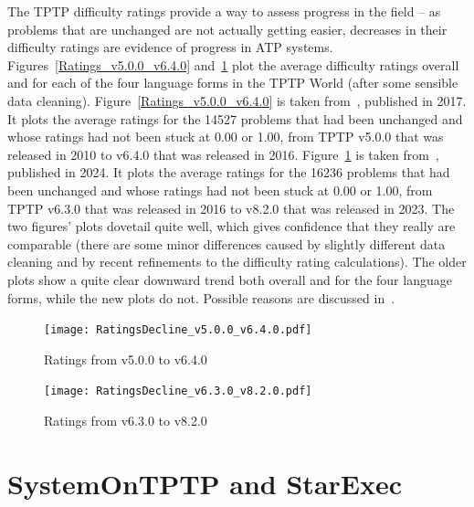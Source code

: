 \documentclass{easychair}
\begin{document}
The TPTP difficulty ratings provide a way to assess progress in the field -- as problems that 
are unchanged are not actually getting easier, decreases in their difficulty ratings are evidence 
of progress in ATP systems.
Figures~\ref{Ratings_v5.0.0_v6.4.0} and~\ref{Ratings_v6.3.0_v8.2.0} plot the average difficulty
ratings overall and for each of the four language forms in the TPTP World (after some sensible
data cleaning).
Figure~\ref{Ratings_v5.0.0_v6.4.0} is taken from~\cite{Sut17}, published in 2017.
It plots the average ratings for the 14527 problems that had been unchanged and whose ratings 
had not been stuck at 0.00 or 1.00, from TPTP v5.0.0 that was released in 2010 to v6.4.0 that was
released in 2016. 
Figure~\ref{Ratings_v6.3.0_v8.2.0} is taken from~\cite{SK+24}, published in 2024.
It plots the average ratings for the 16236 problems that had been unchanged and whose ratings 
had not been stuck at 0.00 or 1.00, from TPTP v6.3.0 that was released in 2016 to v8.2.0 that was
released in 2023. 
The two figures’ plots dovetail quite well, which gives confidence that they really are 
comparable (there are some minor differences caused by slightly different data cleaning 
and by recent refinements to the difficulty rating calculations). 
The older plots show a quite clear downward trend both overall and for the four language forms, 
while the new plots do not. 
Possible reasons are discussed in~\cite{SK+24}.

\begin{figure}[t!]
\centering
\begin{minipage}[t]{.49\textwidth}
  \centering
  \texttt{[image: RatingsDecline\_v5.0.0\_v6.4.0.pdf]}
  \vspace*{-2em}
  \caption{Ratings from v5.0.0 to v6.4.0}
  \label{Ratings_v5.0.0_v6.4.0}
\end{minipage}
\begin{minipage}[t]{.49\textwidth}
  \centering
  \texttt{[image: RatingsDecline\_v6.3.0\_v8.2.0.pdf]}
  \vspace*{-2em}
  \caption{Ratings from v6.3.0 to v8.2.0}
  \label{Ratings_v6.3.0_v8.2.0}
\end{minipage}
\end{figure}


\section{SystemOnTPTP and StarExec}
\label{StarExec}
\end{document}
